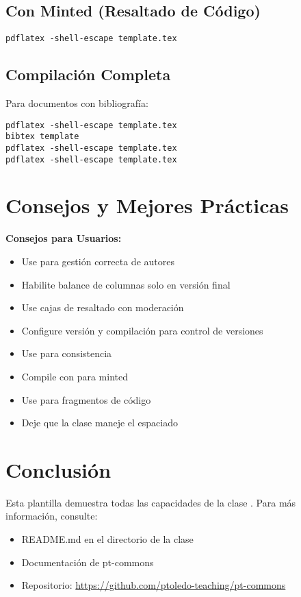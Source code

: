 \documentclass{pt-article}
\begin{document}
\subsection{Con Minted (Resaltado de Código)}

\begin{verbatim}
pdflatex -shell-escape template.tex
\end{verbatim}

\subsection{Compilación Completa}

Para documentos con bibliografía:

\begin{verbatim}
pdflatex -shell-escape template.tex
bibtex template
pdflatex -shell-escape template.tex
pdflatex -shell-escape template.tex
\end{verbatim}

\section{Consejos y Mejores Prácticas}

\begin{highlightbox}
\textbf{Consejos para Usuarios:}
\begin{itemize}
    \item Use  para gestión correcta de autores
    \item Habilite balance de columnas solo en versión final
    \item Use cajas de resaltado con moderación
    \item Configure versión y compilación para control de versiones
    \item Use  para consistencia
    \item Compile con  para minted
    \item Use  para fragmentos de código
    \item Deje que la clase maneje el espaciado
\end{itemize}
\end{highlightbox}

\section{Conclusión}

Esta plantilla demuestra todas las capacidades de la clase .
Para más información, consulte:

\begin{itemize}
    \item README.md en el directorio de la clase
    \item Documentación de pt-commons
    \item Repositorio: \url{https://github.com/ptoledo-teaching/pt-commons}
\end{itemize}

% 
% 
\end{document}
